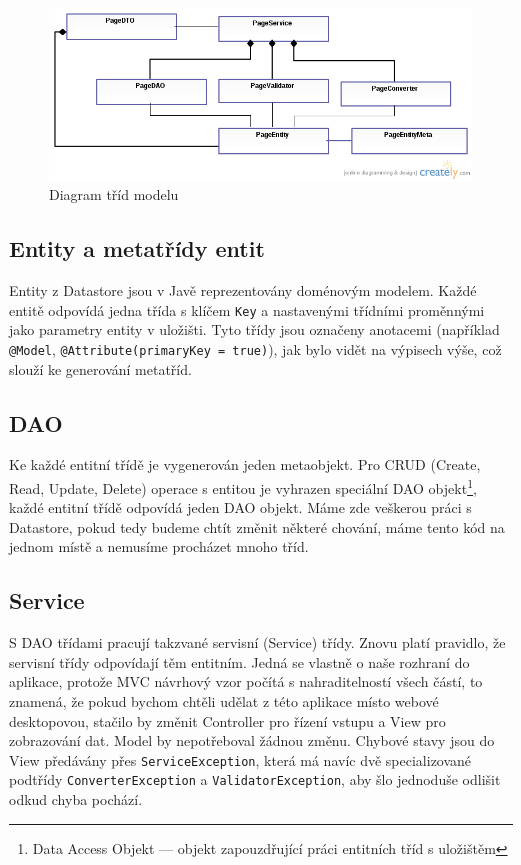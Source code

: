 \begin{figure}[h]
\begin{center}
\includegraphics[width=5in]{figures/cms-uml.png}
\caption{Diagram tříd modelu}
\label{fig:modelUml}
\end{center}
\end{figure}

\subsection{Entity a metatřídy entit}
Entity z Datastore jsou v Javě reprezentovány doménovým modelem. Každé entitě odpovídá jedna třída s klíčem \verb|Key| a nastavenými třídními proměnnými jako parametry entity v uložišti. Tyto třídy jsou označeny anotacemi (například \verb|@Model|, \verb|@Attribute(primaryKey = true)|), jak bylo vidět na výpisech výše, což slouží ke generování metatříd. 

\subsection{DAO}
Ke každé entitní třídě je vygenerován jeden metaobjekt. Pro CRUD (Create, Read, Update, Delete) operace s entitou je vyhrazen speciální DAO objekt\footnote{Data Access Objekt --- objekt zapouzdřující práci entitních tříd s uložištěm}, každé entitní třídě odpovídá jeden DAO objekt. Máme zde veškerou práci s Datastore, pokud tedy budeme chtít změnit některé chování, máme tento kód na jednom místě a nemusíme procházet mnoho tříd. 

\subsection{Service}
S DAO třídami pracují takzvané servisní (Service) třídy. Znovu platí pravidlo, že servisní třídy odpovídají těm entitním. Jedná se vlastně o naše rozhraní do aplikace, protože MVC návrhový vzor počítá s nahraditelností všech částí, to znamená, že pokud bychom chtěli udělat z této aplikace místo webové desktopovou, stačilo by změnit Controller pro řízení vstupu a View pro zobrazování dat. Model by nepotřeboval žádnou změnu. Chybové stavy jsou do View předávány přes \verb|ServiceException|, která má navíc dvě specializované podtřídy \verb|ConverterException| a \verb|ValidatorException|, aby šlo jednoduše odlišit odkud chyba pochází. 

